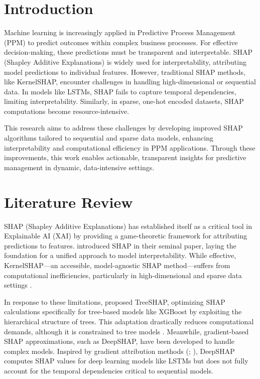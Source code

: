 \section{Introduction}

Machine learning is increasingly applied in Predictive Process Management (PPM) to predict outcomes within complex business processes. For effective decision-making, these predictions must be transparent and interpretable. SHAP (Shapley Additive Explanations) is widely used for interpretability, attributing model predictions to individual features. However, traditional SHAP methods, like KernelSHAP, encounter challenges in handling high-dimensional or sequential data. In models like LSTMs, SHAP fails to capture temporal dependencies, limiting interpretability. Similarly, in sparse, one-hot encoded datasets, SHAP computations become resource-intensive.

This research aims to address these challenges by developing improved SHAP algorithms tailored to sequential and sparse data models, enhancing interpretability and computational efficiency in PPM applications. Through these improvements, this work enables actionable, transparent insights for predictive management in dynamic, data-intensive settings.

\section{Literature Review}

SHAP (Shapley Additive Explanations) has established itself as a critical tool in Explainable AI (XAI) by providing a game-theoretic framework for attributing predictions to features. \cite{lundberg2017unified} introduced SHAP in their seminal paper, laying the foundation for a unified approach to model interpretability. While effective, KernelSHAP—an accessible, model-agnostic SHAP method—suffers from computational inefficiencies, particularly in high-dimensional and sparse data settings \citep{lundberg2017unified}.

In response to these limitations, \cite{lundberg2020local} proposed TreeSHAP, optimizing SHAP calculations specifically for tree-based models like XGBoost by exploiting the hierarchical structure of trees. This adaptation drastically reduces computational demands, although it is constrained to tree models \citep{lundberg2020local}. Meanwhile, gradient-based SHAP approximations, such as DeepSHAP, have been developed to handle complex models. Inspired by gradient attribution methods (\cite{ancona2017towards}; \cite{sundararajan2017axiomatic}), DeepSHAP computes SHAP values for deep learning models like LSTMs but does not fully account for the temporal dependencies critical to sequential models.

